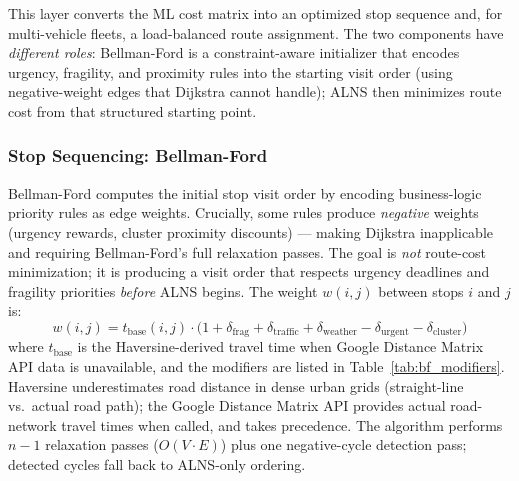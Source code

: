 \documentclass[conference]{IEEEtran}
\newcommand{\mar}[1]{\textcolor{black!90!white}{#1}}
\begin{document}
This layer converts the ML cost matrix into an optimized stop sequence and,
for multi-vehicle fleets, a load-balanced route assignment. The two components
have \textit{different roles}: Bellman-Ford is a constraint-aware initializer
that encodes urgency, fragility, and proximity rules into the starting visit
order (using negative-weight edges that Dijkstra cannot handle); ALNS then
minimizes route cost from that structured starting point.

\mar{\subsubsection{Stop Sequencing: Bellman-Ford}}
\label{sec:bf}

Bellman-Ford computes the initial stop visit order by encoding business-logic
priority rules as edge weights. Crucially, some rules produce \textit{negative}
weights (urgency rewards, cluster proximity discounts) — making Dijkstra
inapplicable and requiring Bellman-Ford's full relaxation passes. The goal is
\textit{not} route-cost minimization; it is producing a visit order that respects
urgency deadlines and fragility priorities \textit{before} ALNS begins. The weight
$w(i,j)$ between stops $i$ and $j$ is:
\[
  w(i,j) = t_{\text{base}}(i,j) \cdot
  \bigl(1 + \delta_{\text{frag}} + \delta_{\text{traffic}}
  + \delta_{\text{weather}} - \delta_{\text{urgent}}
  - \delta_{\text{cluster}}\bigr)
\]
where $t_{\text{base}}$ is the Haversine-derived travel time when Google
Distance Matrix API data is unavailable, and the modifiers are listed in
Table~\ref{tab:bf_modifiers}. Haversine underestimates road distance in dense
urban grids (straight-line vs.\ actual road path); the Google Distance Matrix
API provides actual road-network travel times when called, and takes precedence.
The algorithm performs $n-1$ relaxation passes
($O(V \cdot E)$) plus one negative-cycle detection pass; detected cycles
fall back to ALNS-only ordering.
\end{document}
